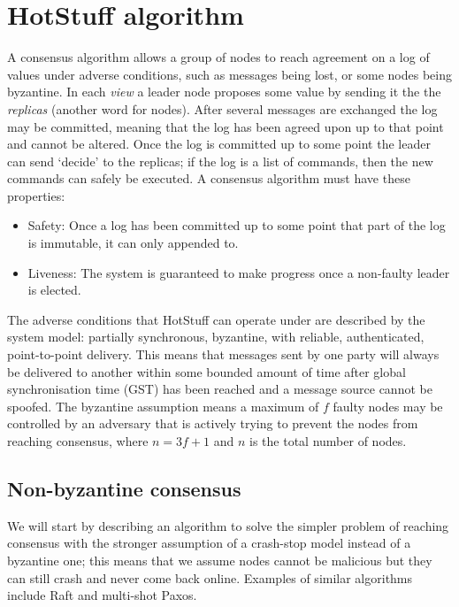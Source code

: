 
\section{HotStuff algorithm} \label{hotstufftheory}
A consensus algorithm allows a group of nodes to reach agreement on a log of values under adverse conditions, such as messages being lost, or some nodes being byzantine. In each \textit{view} a leader node proposes some value by sending it the the \textit{replicas} (another word for nodes). After several messages are exchanged the log may be committed, meaning that the log has been agreed upon up to that point and cannot be altered. Once the log is committed up to some point the leader can send `decide' to the replicas; if the log is a list of commands, then the new commands can safely be executed. A consensus algorithm must have these properties:

\begin{itemize}
	\item Safety: Once a log has been committed up to some point that part of the log is immutable, it can only appended to.
	\item Liveness: The system is guaranteed to make progress once a non-faulty leader is elected.
\end{itemize}

The adverse conditions that HotStuff can operate under are described by the system model: partially synchronous, byzantine, with reliable, authenticated, point-to-point delivery. This means that messages sent by one party will always be delivered to another within some bounded amount of time after global synchronisation time (GST) has been reached and a message source cannot be spoofed. The byzantine assumption means a maximum of $f$ faulty nodes may be controlled by an adversary that is actively trying to prevent the nodes from reaching consensus, where $n = 3f + 1$ and $n$ is the total number of nodes.

\subsection{Non-byzantine consensus}
We will start by describing an algorithm to solve the simpler problem of reaching consensus with the stronger assumption of a crash-stop model instead of a byzantine one; this means that we assume nodes cannot be malicious but they can still crash and never come back online. Examples of similar algorithms include Raft and multi-shot Paxos.

